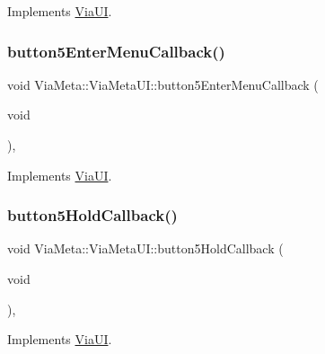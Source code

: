 Implements \mbox{\hyperlink{class_via_u_i_a4925f089aa720ca88d84246f434112e9}{Via\+UI}}.

\mbox{\label{class_via_meta_1_1_via_meta_u_i_af14bee3824185ab5a97d8745e9317370}} 
\subsubsection{\texorpdfstring{button5\+Enter\+Menu\+Callback()}{button5EnterMenuCallback()}}
{\footnotesize\ttfamily void Via\+Meta\+::\+Via\+Meta\+U\+I\+::button5\+Enter\+Menu\+Callback (\begin{DoxyParamCaption}\item[{void}]{ }\end{DoxyParamCaption})\hspace{0.3cm}{\ttfamily [override]}, {\ttfamily [virtual]}}



Implements \mbox{\hyperlink{class_via_u_i_adb40844fb1fa8e623f3a7eaecdbfad53}{Via\+UI}}.

\mbox{\label{class_via_meta_1_1_via_meta_u_i_a225952a745a18a354c5ed3f890d8df0d}} 
\subsubsection{\texorpdfstring{button5\+Hold\+Callback()}{button5HoldCallback()}}
{\footnotesize\ttfamily void Via\+Meta\+::\+Via\+Meta\+U\+I\+::button5\+Hold\+Callback (\begin{DoxyParamCaption}\item[{void}]{ }\end{DoxyParamCaption})\hspace{0.3cm}{\ttfamily [override]}, {\ttfamily [virtual]}}



Implements \mbox{\hyperlink{class_via_u_i_aee783713c816e3807514ee9b06b571b0}{Via\+UI}}.

